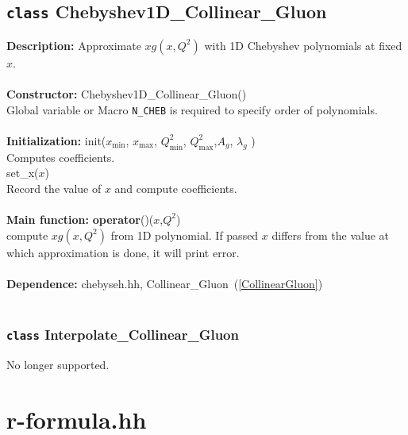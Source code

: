 \documentclass[12pt]{article}
\newenvironment{entry}[1]{\textbf{\large #1:  }}{\\\vspace{3mm}\\}
\begin{document}
\subsection{\texttt{class} Chebyshev1D\_Collinear\_Gluon}\label{Chebyshev1DCollinearGluon}
\begin{entry}{Description}
	Approximate $xg(x,Q^2)$ with 1D Chebyshev polynomials at fixed $x$. 
\end{entry}
\begin{entry}{Constructor}
	Chebyshev1D\_Collinear\_Gluon()\\
	Global variable or Macro \texttt{N\_CHEB} is required to specify order of polynomials.
\end{entry}
\begin{entry}{Initialization}
	init($x_{\mathrm{min}}$, $x_{\mathrm{max}}$, $Q^2_{\mathrm{min}}$, $Q^2_{\mathrm{max}}$,$A_g$, $\lambda_g$ )\\
	Computes coefficients.\\
	set\_x($x$)\\
	Record the value of $x$ and compute coefficients.
\end{entry}
\begin{entry}{Main function}
	\textbf{operator}()($x$,$Q^2$)\\
	compute $xg(x,Q^2)$ from 1D polynomial. If passed $x$ differs from the value at which approximation is done, it will print error.
\end{entry}
\begin{entry}{Dependence}
	chebyseh.hh, Collinear\_Gluon~(\ref{CollinearGluon})
\end{entry}
\subsubsection{\texttt{class} Interpolate\_Collinear\_Gluon}
No longer supported.

\section{r-formula.hh}
\end{document}

